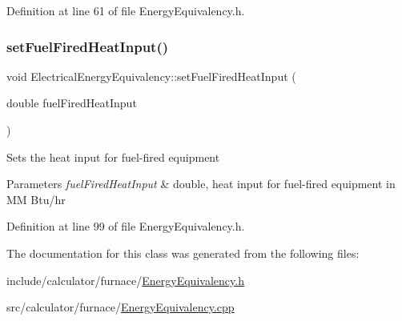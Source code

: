Definition at line 61 of file Energy\+Equivalency.\+h.

\mbox{\label{class_electrical_energy_equivalency_a9daf2b93c52c31cb999e5a9a18f1dd54}} 
\subsubsection{\texorpdfstring{set\+Fuel\+Fired\+Heat\+Input()}{setFuelFiredHeatInput()}}
{\footnotesize\ttfamily void Electrical\+Energy\+Equivalency\+::set\+Fuel\+Fired\+Heat\+Input (\begin{DoxyParamCaption}\item[{double}]{fuel\+Fired\+Heat\+Input }\end{DoxyParamCaption})\hspace{0.3cm}{\ttfamily [inline]}}

Sets the heat input for fuel-\/fired equipment


\begin{DoxyParams}{Parameters}
{\em fuel\+Fired\+Heat\+Input} & double, heat input for fuel-\/fired equipment in MM Btu/hr \\
\hline
\end{DoxyParams}


Definition at line 99 of file Energy\+Equivalency.\+h.



The documentation for this class was generated from the following files\+:\begin{DoxyCompactItemize}
\item 
include/calculator/furnace/\hyperlink{_energy_equivalency_8h}{Energy\+Equivalency.\+h}\item 
src/calculator/furnace/\hyperlink{_energy_equivalency_8cpp}{Energy\+Equivalency.\+cpp}\end{DoxyCompactItemize}
